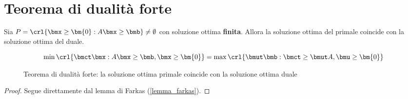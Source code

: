 \documentclass[\main/main.tex]{subfiles}
\begin{document}
\section{Teorema di dualità forte}
\begin{theorem}
  \label{dualita_forte}
  Sia $P = \crl{\bmx \geq \bm{0}: A\bmx \geq \bmb} \neq \emptyset$ con soluzione ottima \textbf{finita}. Allora la soluzione ottima del primale coincide con la soluzione ottima del duale.

  \begin{figure}
    \[
      \min\crl{\bmct\bmx: A\bmx \geq \bmb, \bmx \geq \bm{0}} = \max\crl{\bmut\bmb: \bmct \geq \bmut A, \bmu \geq \bm{0}}
    \]
    \caption{Teorema di dualità forte: la soluzione ottima primale coincide con la soluzione ottima duale}
  \end{figure}
\end{theorem}

\begin{proof}
  Segue direttamente dal lemma di Farkas (\ref{lemma_farkas}).
\end{proof}
\end{document}
